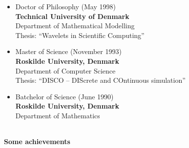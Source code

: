 \documentclass[11pt,a4paper]{article}
\begin{document}
\begin{itemize}
\item Doctor of Philosophy (May 1998) \\
{\bf Technical University of Denmark} \\
Department of Mathematical Modelling  \\
Thesis: ``Wavelets in Scientific Computing''\\

\item  Master of Science (November 1993) \\
{\bf Roskilde University, Denmark} \\
Department of Computer Science \\
Thesis: ``DISCO -- DIScrete and COntinuous simulation''\\

\item  Batchelor of Science (June 1990) \\
{\bf Roskilde University, Denmark} \\
Department of Mathematics \\
\end{itemize}

\begin{center}
  \hrulefill \\
  {\bf Some achievements} \\[-0.2cm]
  \hrulefill
\end{center}
\end{document}
